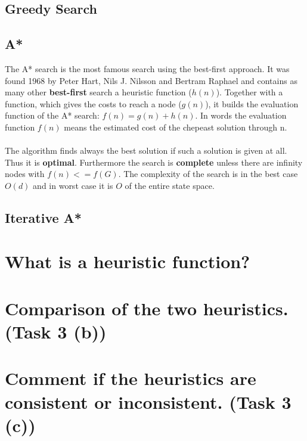 \documentclass[11pt]{article}
\begin{document}
\subsection{Greedy Search}

\subsection{A*}
The A* search is the most famous search using the best-first approach. It was found 1968 by Peter Hart, Nils J. Nilsson and Bertram Raphael and contains as many other \textbf{best-first} search a heuristic function ($h(n)$). Together with a function, which gives the costs to reach a node ($g(n)$), it builds the evaluation function of the A* search: $f(n) = g(n) + h(n)$. In words the evaluation function $f(n)$ means the estimated cost of the chepeast solution through n.\\
\\
The algorithm finds always the best solution if such a  solution is given at all. Thus it is \textbf{optimal}. Furthermore the search is \textbf{complete} unless there are infinity nodes with $f(n) <= f(G)$. The complexity of the search is in the best case $O(d)$ and in worst case it is $O$ of the entire state space.

\subsection{Iterative A*}

\newpage
\section{What is a heuristic function?}

\newpage
\section{Comparison of the two heuristics. (Task 3 (b))}

\newpage
\section{Comment if the heuristics are consistent or inconsistent. (Task 3 (c))}
\end{document}
